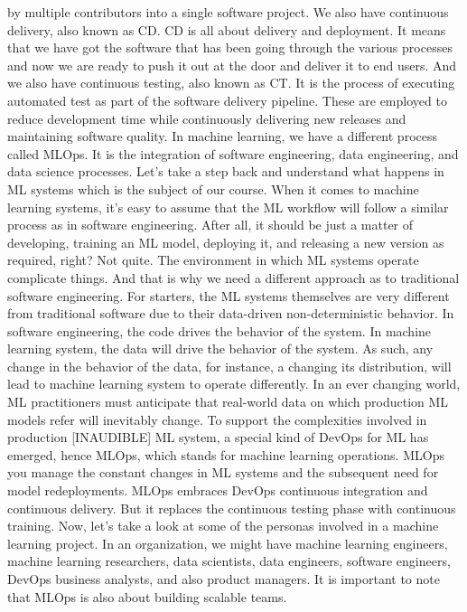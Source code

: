 by multiple contributors into a single software project.
We also have continuous delivery, also known as CD.
CD is all about delivery and deployment.
It means that we have got the software that
has been going through the various processes
and now we are ready to push it out at the door and deliver it to end users.
And we also have continuous testing, also known as CT.
It is the process of executing automated test as part of the software delivery
pipeline.
These are employed to reduce development time
while continuously delivering new releases
and maintaining software quality.
In machine learning, we have a different process called MLOps.
It is the integration of software engineering, data engineering,
and data science processes.
Let's take a step back and understand what
happens in ML systems which is the subject of our course.
When it comes to machine learning systems,
it's easy to assume that the ML workflow will follow a similar process
as in software engineering.
After all, it should be just a matter of developing, training an ML model,
deploying it, and releasing a new version as required, right?
Not quite.
The environment in which ML systems operate complicate things.
And that is why we need a different approach
as to traditional software engineering.
For starters, the ML systems themselves are
very different from traditional software due to their data-driven
non-deterministic behavior.
In software engineering, the code drives the behavior of the system.
In machine learning system, the data will drive the behavior of the system.
As such, any change in the behavior of the data, for instance,
a changing its distribution, will lead to machine learning system
to operate differently.
In an ever changing world, ML practitioners
must anticipate that real-world data on which production ML models refer
will inevitably change.
To support the complexities involved in production [INAUDIBLE] ML system,
a special kind of DevOps for ML has emerged, hence MLOps, which
stands for machine learning operations.
MLOps you manage the constant changes in ML systems
and the subsequent need for model redeployments.
MLOps embraces DevOps continuous integration and continuous delivery.
But it replaces the continuous testing phase with continuous training.
Now, let's take a look at some of the personas involved
in a machine learning project.
In an organization, we might have machine
learning engineers, machine learning researchers, data scientists, data
engineers, software engineers, DevOps business analysts, and also product
managers.
It is important to note that MLOps is also about building scalable teams.
